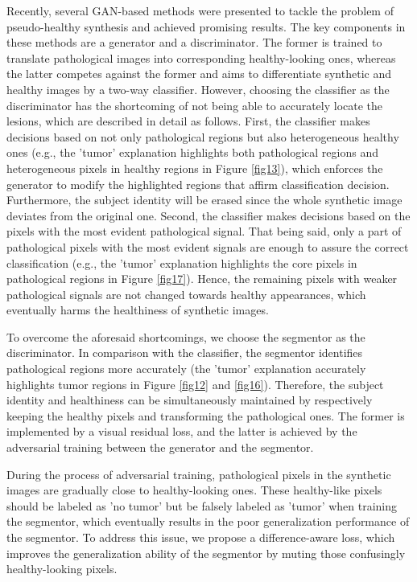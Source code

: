 \documentclass[journal,twoside,web]{ieeecolor}
\begin{document}
Recently, several GAN-based methods \cite{baumgartner2018visual,sun2020adversarial,xia2020pseudo} were presented to tackle the problem of pseudo-healthy synthesis and achieved promising results. The key components in these methods are a generator and a discriminator. The former is trained to translate pathological images into corresponding healthy-looking ones, whereas the latter competes against the former and aims to differentiate synthetic and healthy images by a two-way classifier. However, choosing the classifier as the discriminator has the shortcoming of not being able to accurately locate the lesions, which are described in detail as follows. First, the classifier makes decisions based on not only pathological regions but also heterogeneous healthy ones (e.g., the 'tumor' explanation highlights both pathological regions and heterogeneous pixels in healthy regions in Figure \ref{fig13}), which enforces the generator to modify the highlighted regions that affirm classification decision. Furthermore, the subject identity will be erased since the whole synthetic image deviates from the original one. Second, the classifier makes decisions based on the pixels with the most evident pathological signal. That being said, only a part of pathological pixels with the most evident signals are enough to assure the correct classification (e.g., the 'tumor' explanation highlights the core pixels in pathological regions in Figure \ref{fig17}). Hence, the remaining pixels with weaker pathological signals are not changed towards healthy appearances, which eventually harms the healthiness of synthetic images.

To overcome the aforesaid shortcomings, we choose the segmentor as the discriminator. In comparison with the classifier, the segmentor identifies pathological regions more accurately (the 'tumor' explanation accurately highlights tumor regions in Figure \ref{fig12} and \ref{fig16}). Therefore, the subject identity and healthiness can be simultaneously maintained by respectively keeping the healthy pixels and transforming the pathological ones. The former is implemented by a visual residual loss, and the latter is achieved by the adversarial training between the generator and the segmentor.

During the process of adversarial training, pathological pixels in the synthetic images are gradually close to healthy-looking ones. These healthy-like pixels should be labeled as 'no tumor' but be falsely labeled as 'tumor' when training the segmentor, which eventually results in the poor generalization performance of the segmentor. To address this issue, we propose a difference-aware loss, which improves the generalization ability of the segmentor by muting those confusingly healthy-looking pixels. 
\end{document}
